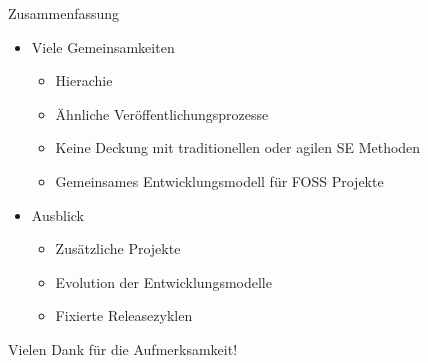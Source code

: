 \documentclass[11pt]{beamer}
\begin{document}
\begin{frame}{Zusammenfassung}
  \begin{itemize}
    \item Viele Gemeinsamkeiten
    \begin{itemize}
    \item Hierachie
    \item Ähnliche Veröffentlichungsprozesse
    \item Keine Deckung mit traditionellen oder agilen SE Methoden
    \item Gemeinsames Entwicklungsmodell für FOSS Projekte
    \end{itemize}
    \item Ausblick
    \begin{itemize}
      \item Zusätzliche Projekte
      \item Evolution der Entwicklungsmodelle
      \item Fixierte Releasezyklen
    \end{itemize}
  \end{itemize}
\end{frame}

\begin{frame}
  \begin{center}
  {\Large Vielen Dank für die Aufmerksamkeit!}
  \end{center}
\end{frame}
\end{document}

